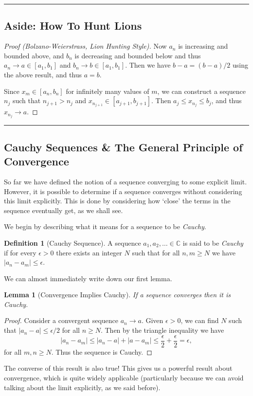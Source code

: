 \documentclass[11pt, a4paper]{article}
\newtheorem{lemma}[theorem]{Lemma}
\theoremstyle{definition}
\newtheorem{definition}[theorem]{Definition}
\newenvironment{aside}[1]{
	\noindent
    \rule{\textwidth}{0.025cm}
    \vspace{-1.75\baselineskip}
    \subsection*{#1}}
{\noindent\rule{\textwidth}{0.025cm}}
\newcommand{\vocab}[1]{\emph{#1}} %
\newcommand{\C}{\mathbb{C}}
\begin{document}
\begin{aside}{Aside: How To Hunt Lions}
\begin{proof}[Proof (Bolzano-Weierstrass, Lion Hunting Style)]
	Now $a_n$ is increasing and bounded above, and $b_n$ is decreasing and bounded below and thus $a_n \rightarrow a \in [a_1, b_1]$ and $b_n \rightarrow b \in [a_1, b_1]$. Then we have $b - a = (b - a)/2$ using the above result, and thus $a = b$.

	Since $x_m \in [a_n, b_n]$ for infinitely many values of $m$, we can construct a sequence $n_j$ such that $n_{j + 1} > n_j$ and $x_{n_{j + 1}} \in [a_{j + 1}, b_{j + 1}]$. Then $a_j \leq x_{n_j} \leq b_j$, and thus $x_{n_j} \rightarrow a$.
\end{proof}
\end{aside}




\subsection{Cauchy Sequences \& The General Principle of Convergence}

So far we have defined the notion of a sequence converging to some explicit limit. However, it is possible to determine if a sequence converges without considering this limit explicitly. This is done by considering how `close' the terms in the sequence eventually get, as we shall see.

We begin by describing what it means for a sequence to be \emph{Cauchy}.

\begin{definition}[Cauchy Sequence]
	A sequence $a_1, a_2, \dots \in \C$ is said to be \vocab{Cauchy} if for every $\epsilon > 0$ there exists an integer $N$ such that for all $n, m \geq N$ we have $|a_n - a_m| \leq \epsilon$.
\end{definition}

We can almost immediately write down our first lemma.

\begin{lemma}[Convergence Implies Cauchy]
	If a sequence converges then it is Cauchy.
\end{lemma}
\begin{proof}
	Consider a convergent sequence $a_n \rightarrow a$.
	Given $\epsilon > 0$, we can find $N$ such that
	$|a_n - a| \leq \epsilon / 2$ for all $n \geq N$.
	Then by the triangle inequality we have
	$$
	|a_n - a_m| \leq |a_n - a| + |a - a_m| \leq \frac{\epsilon}{2} + \frac{\epsilon}{2} = \epsilon,
	$$
	for all $m, n \geq N$. Thus the sequence is Cauchy.
\end{proof}

The converse of this result is also true! This gives us a powerful result about convergence, which is quite widely applicable (particularly because we can avoid talking about the limit explicitly, as we said before).
\end{document}
